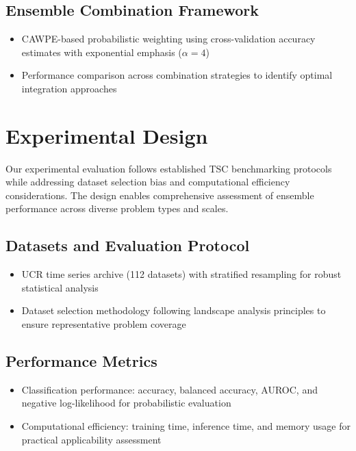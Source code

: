 \documentclass[pdflatex,sn-basic]{sn-jnl}           %
\theoremstyle{thmstyleone}%
\theoremstyle{thmstyletwo}%
\theoremstyle{thmstylethree}%
\begin{document}
\subsection{Ensemble Combination Framework}
\begin{itemize}
\item CAWPE-based probabilistic weighting using cross-validation accuracy estimates with exponential emphasis ($\alpha=4$)
\item Performance comparison across combination strategies to identify optimal integration approaches
\end{itemize}

\section{Experimental Design}\label{sec4}

Our experimental evaluation follows established TSC benchmarking protocols while addressing dataset selection bias and computational efficiency considerations. The design enables comprehensive assessment of ensemble performance across diverse problem types and scales.

\subsection{Datasets and Evaluation Protocol}
\begin{itemize}
\item UCR time series archive (112 datasets) with stratified resampling for robust statistical analysis
\item Dataset selection methodology following landscape analysis principles to ensure representative problem coverage
\end{itemize}

\subsection{Performance Metrics}
\begin{itemize}
\item Classification performance: accuracy, balanced accuracy, AUROC, and negative log-likelihood for probabilistic evaluation
\item Computational efficiency: training time, inference time, and memory usage for practical applicability assessment
\end{itemize}
\end{document}
